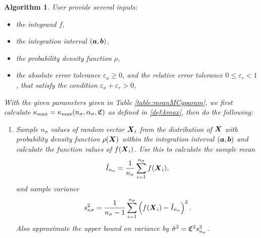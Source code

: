 \documentclass{iitthesis}
\newtheorem{algorithm}[theorem]{Algorithm}
\theoremstyle{definition}
\begin{document}
\begin{algorithm}\label{alg:cubMCg} 
User provide several inputs:
\begin{itemize}
\item the integrand $f$,
\item the integration interval $(\boldsymbol{a}, \boldsymbol{b})$,
\item the probability density function $\rho$,
\item the absolute error tolerance $\varepsilon_a \geq 0$, and the relative error tolerance $0 \leq \varepsilon_r <1$, that satisfy the condition $\varepsilon_a+\varepsilon_r >0$,
\end{itemize} 
With the given parameters given in Table \ref{table:meanMCgparam}, we first calculate $\kappa_{\max}=\kappa_{\max}(n_\sigma,\alpha_\sigma,\mathfrak{C})$ as defined in \eqref{def:kmax}, then do the following:
\begin{enumerate}
\item Sample $n_\sigma$ values of random vector $\boldsymbol{X}_i$ from the distribution of $\boldsymbol{X}$ with probability density function $\rho(\boldsymbol{X})$ within the integration interval $(\boldsymbol{a}, \boldsymbol{b})$ and calculate the function values of $f(\boldsymbol{X}_i)$. Use this to calculate the sample mean $$\hat{I}_{n_\sigma} = \frac{1}{n_\sigma}\sum_{i=1}^{n_\sigma} f(\boldsymbol{X}_i),$$ and sample variance $$s_{n\sigma}^2 = \frac{1}{n_\sigma-1}\sum_{i=1}^{n_\sigma} \left(f(\boldsymbol{X}_i)-\hat{I}_{n_\sigma}\right)^2.$$ Also approximate the upper bound on variance by $\hat{\sigma}^2 = \mathfrak{C}^2 s^2_{n_\sigma}$. 


\end{enumerate}
\end{algorithm}
\end{document}
